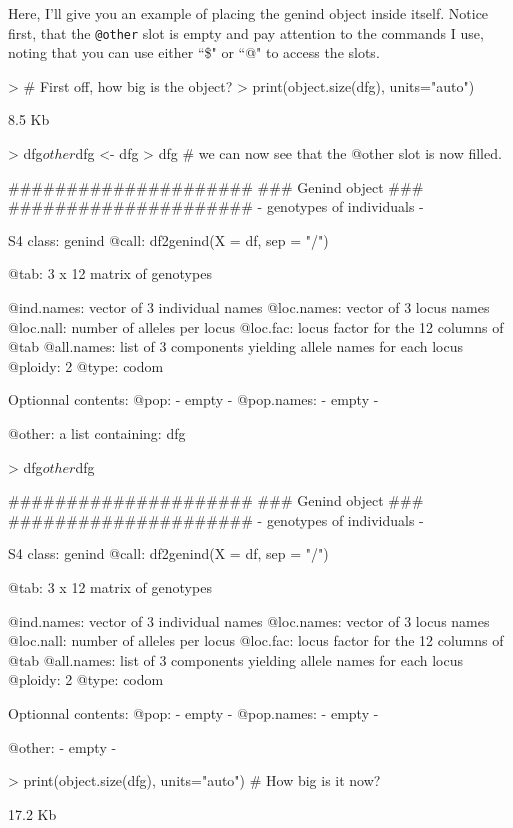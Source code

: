 \documentclass[letterpaper]{article}
\begin{document}
Here, I'll give you an example of placing the genind object inside itself. Notice first, that the \texttt{@other} slot is empty and pay attention to the commands I use, noting that you can use either ``\$" or ``@" to access the slots.
\begin{Schunk}
\begin{Sinput}
> # First off, how big is the object?
> print(object.size(dfg), units="auto")
\end{Sinput}
\begin{Soutput}
8.5 Kb
\end{Soutput}
\begin{Sinput}
> dfg$other$dfg <- dfg
> dfg # we can now see that the @other slot is now filled.
\end{Sinput}
\begin{Soutput}
   #####################
   ### Genind object ### 
   #####################
- genotypes of individuals - 

S4 class:  genind
@call: df2genind(X = df, sep = "/")

@tab:  3 x 12 matrix of genotypes

@ind.names: vector of  3 individual names
@loc.names: vector of  3 locus names
@loc.nall: number of alleles per locus
@loc.fac: locus factor for the  12 columns of @tab
@all.names: list of  3 components yielding allele names for each locus
@ploidy:  2
@type:  codom

Optionnal contents: 
@pop:  - empty -
@pop.names:  - empty -

@other: a list containing: dfg 
\end{Soutput}
\begin{Sinput}
> dfg$other$dfg
\end{Sinput}
\begin{Soutput}
   #####################
   ### Genind object ### 
   #####################
- genotypes of individuals - 

S4 class:  genind
@call: df2genind(X = df, sep = "/")

@tab:  3 x 12 matrix of genotypes

@ind.names: vector of  3 individual names
@loc.names: vector of  3 locus names
@loc.nall: number of alleles per locus
@loc.fac: locus factor for the  12 columns of @tab
@all.names: list of  3 components yielding allele names for each locus
@ploidy:  2
@type:  codom

Optionnal contents: 
@pop:  - empty -
@pop.names:  - empty -

@other: - empty -
\end{Soutput}
\begin{Sinput}
> print(object.size(dfg), units="auto") # How big is it now?
\end{Sinput}
\begin{Soutput}
17.2 Kb
\end{Soutput}
\end{Schunk}
\end{document}
